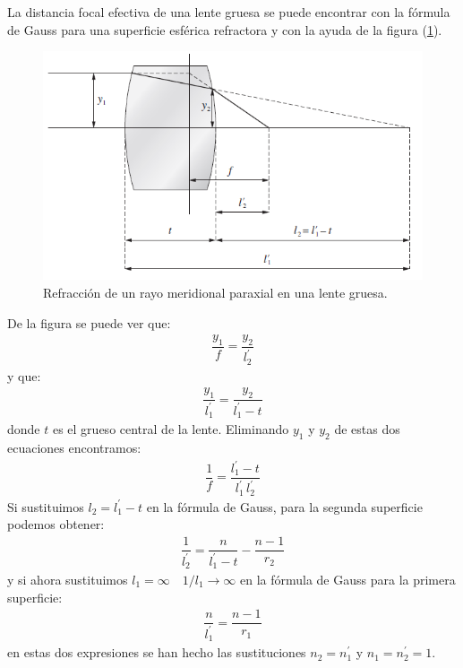 \documentclass[14pt]{extarticle}
\begin{document}
La distancia focal efectiva de una lente gruesa se puede encontrar con la fórmula de Gauss para una superficie esférica refractora y con la ayuda de la figura (\ref{fig:figura_III_06}).
\begin{figure}[H]
    \centering
    \includegraphics[scale=0.7]{Imagenes/Lentes_Gruesas_05.png}
    \caption{Refracción de un rayo meridional paraxial en una lente gruesa.}
    \label{fig:figura_III_06}
\end{figure}
De la figura se puede ver que:
\begin{align}
\dfrac{y_{1}}{f} = \dfrac{y_{2}}{l_{2}^{\prime}}
\label{eq:ecuacion_III_23}
\end{align}
y que:
\begin{align}
\dfrac{y_{1}}{l_{1}^{\prime}} = \dfrac{y_{2}}{l_{1}^{\prime} - t}
\label{eq:ecuacion_III_24}
\end{align}
donde $t$ es el grueso central de la lente. Eliminando $y_{1}$ y $y_{2}$ de estas dos ecuaciones encontramos:
\begin{align}
\dfrac{1}{f} = \dfrac{l_{1}^{\prime} - t}{l_{1}^{\prime} \, l_{2}^{\prime}}
\label{eq:ecuacion_III_25}
\end{align}
Si sustituimos $l_{2} = l_{1}^{\prime} - t$ en la fórmula de Gauss, para la segunda superficie podemos obtener:
\begin{align}
\dfrac{1}{l_{2}^{\prime}} = \dfrac{n}{l_{1}^{\prime} - t} - \dfrac{n - 1}{r_{2}}
\label{eq:ecuacion_III_26}
\end{align}
y si ahora sustituimos $l_{1} = \infty \quad 1/l_{1} \rightarrow \infty$ en la fórmula de Gauss para la primera superficie:
\begin{align}
\dfrac{n}{l_{1}^{\prime}} = \dfrac{n - 1}{r_{1}}
\label{eq:ecuacion_III_27}
\end{align}
en estas dos expresiones se han hecho las sustituciones $n_{2} = n_{1}^{\prime}$ y $n_{1} = n_{2}^{\prime} = 1$.
\end{document}
